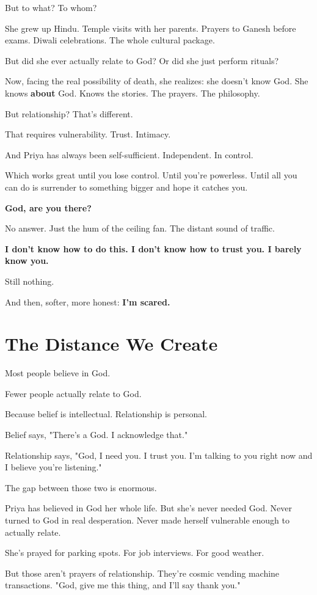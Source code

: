 \documentclass[11pt,twoside]{book}
\begin{document}
But to what? To whom?

She grew up Hindu. Temple visits with her parents. Prayers to Ganesh before exams. Diwali celebrations. The whole cultural package.

But did she ever actually relate to God? Or did she just perform rituals?

Now, facing the real possibility of death, she realizes: she doesn't know God. She knows \textbf{about} God. Knows the stories. The prayers. The philosophy.

But relationship? That's different.

That requires vulnerability. Trust. Intimacy.

And Priya has always been self-sufficient. Independent. In control.

Which works great until you lose control. Until you're powerless. Until all you can do is surrender to something bigger and hope it catches you.

\textbf{God, are you there?}

No answer. Just the hum of the ceiling fan. The distant sound of traffic.

\textbf{I don't know how to do this. I don't know how to trust you. I barely know you.}

Still nothing.

And then, softer, more honest: \textbf{I'm scared.}

\section*{The Distance We Create}

Most people believe in God.

Fewer people actually relate to God.

Because belief is intellectual. Relationship is personal.

Belief says, "There's a God. I acknowledge that."

Relationship says, "God, I need you. I trust you. I'm talking to you right now and I believe you're listening."

The gap between those two is enormous.

Priya has believed in God her whole life. But she's never needed God. Never turned to God in real desperation. Never made herself vulnerable enough to actually relate.

She's prayed for parking spots. For job interviews. For good weather.

But those aren't prayers of relationship. They're cosmic vending machine transactions. "God, give me this thing, and I'll say thank you."
\end{document}
